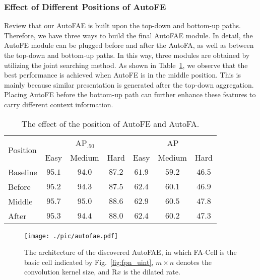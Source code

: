 \documentclass[sigconf]{acmart}
\begin{document}
\subsubsection{Effect of Different Positions of AutoFE}
Review that our AutoFAE is built upon the top-down and bottom-up paths. Therefore, we have three ways to build the final AutoFAE module. In detail, the AutoFE module can be plugged before and after the AutoFA, as well as between the top-down and bottom-up paths. In this way, three modules are obtained by utilizing the joint searching method. As shown in Table~\ref{tab:different_position}, we observe that the best performance is achieved when AutoFE is in the middle position. This is mainly because similar presentation is generated after the top-down aggregation. Placing AutoFE before the bottom-up path can further enhance these features to carry different context information.


\begin{table}[!t]
    \centering
    \begin{tabular}{l|ccc|ccc}
        \toprule[1pt]
        \multirow{2}{*}{Position} & \multicolumn{3}{c|}{AP$_{.50}$} & \multicolumn{3}{c}{AP} \\
        \cline{2-7}
        & Easy & Medium & Hard & Easy & Medium & Hard \\
        \midrule[0.5pt]
        Baseline & $95.1$ & $94.0$ & $87.2$ & $61.9$ & $59.2$ & $46.5$ \\
        Before & $95.2$ & $94.3$ & $87.5$ & $62.4$ & $60.1$ & $46.9$ \\
        Middle & $\mathbf{95.7}$ & $\mathbf{95.0}$ & $\mathbf{88.6}$ & $\mathbf{62.9}$ & $\mathbf{60.5}$ & $\mathbf{47.8}$ \\
        After & $95.3$ & $94.4$ & $88.0$ & $62.4$ & $60.2$ & $47.3$ \\
        \bottomrule[1pt]
    \end{tabular}
    \caption{The effect of the position of AutoFE and AutoFA.}
    \label{tab:different_position}
\end{table}



\begin{figure}[!t]
    \centering
    \texttt{[image: ./pic/autofae.pdf]}
    \vspace{-2.5mm}
    \caption{The architecture of the discovered AutoFAE, in which FA-Cell is the basic cell indicated by Fig.~\ref{fig:fpn_uint}, $m\!\times\! n$ denotes the convolution kernel size, and R$x$ is the dilated rate.}
    \vspace{-3.5mm}
    \label{fig:autofae}
\end{figure}
\end{document}
